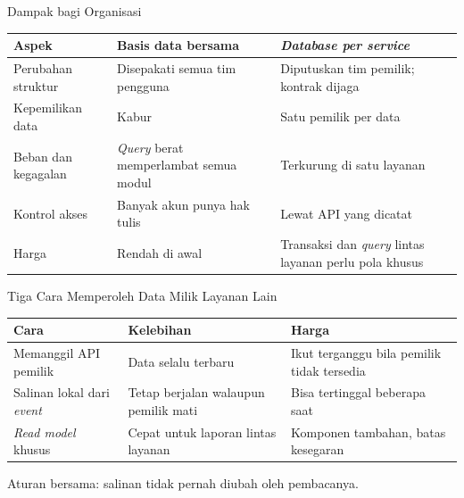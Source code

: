 \documentclass[aspectratio=169, table, 12pt]{beamer}
\begin{document}
\begin{frame}{{\Large Dampak bagi Organisasi}}
  \footnotesize
  \begin{tabularx}{\textwidth}{>{\raggedright\arraybackslash}p{2.8cm}
      >{\raggedright\arraybackslash}X >{\raggedright\arraybackslash}X}
    \hline
    \textbf{Aspek} & \textbf{Basis data bersama} &
      \textbf{\textit{Database per service}} \\
    \hline
    Perubahan struktur & Disepakati semua tim pengguna & Diputuskan tim
      pemilik; kontrak dijaga \\
    \hline
    Kepemilikan data & Kabur & Satu pemilik per data \\
    \hline
    Beban dan kegagalan & \textit{Query} berat memperlambat semua modul &
      Terkurung di satu layanan \\
    \hline
    Kontrol akses & Banyak akun punya hak tulis & Lewat API yang dicatat \\
    \hline
    Harga & Rendah di awal & Transaksi dan \textit{query} lintas layanan perlu
      pola khusus \\
    \hline
  \end{tabularx}
\end{frame}

\begin{frame}{{\Large Tiga Cara Memperoleh Data Milik Layanan Lain}}
  \footnotesize
  \begin{tabularx}{\textwidth}{>{\raggedright\arraybackslash}p{3.2cm}
      >{\raggedright\arraybackslash}X >{\raggedright\arraybackslash}X}
    \hline
    \textbf{Cara} & \textbf{Kelebihan} & \textbf{Harga} \\
    \hline
    Memanggil API pemilik & Data selalu terbaru & Ikut terganggu bila pemilik
      tidak tersedia \\
    \hline
    Salinan lokal dari \textit{event} & Tetap berjalan walaupun pemilik mati &
      Bisa tertinggal beberapa saat \\
    \hline
    \textit{Read model} khusus & Cepat untuk laporan lintas layanan & Komponen
      tambahan, batas kesegaran \\
    \hline
  \end{tabularx}

  \vspace{10pt}
  \small
  Aturan bersama: salinan tidak pernah diubah oleh pembacanya.
\end{frame}
\end{document}
